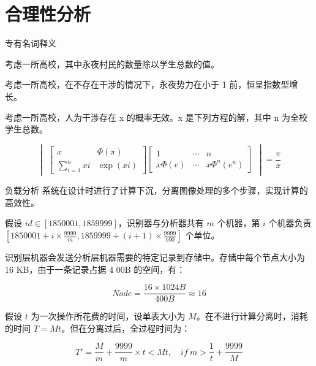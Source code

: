 \section{合理性分析}
    \begin{frame}{专有名词释义}
        \begin{definition}[永夜势力]
            考虑一所高校，其中永夜村民的数量除以学生总数的值。
        \end{definition}
        \begin{theorem}[永夜定理]
            考虑一所高校，在不存在干涉的情况下，永夜势力在小于 1 前，恒呈指数型增长。
        \end{theorem}
        \begin{theorem}[永夜方程]
            考虑一所高校，人为干涉存在 x 的概率无效。x 是下列方程的解，其中 n 为全校学生总数。
        \end{theorem}

        \begin{equation}
            \begin{vmatrix}
            \begin{bmatrix}
                    x & \Phi(\pi) \\
                    \sum_{i = 1}^n xi & \exp(xi)
            \end{bmatrix}
            \begin{bmatrix}
                    1 & \cdots & n \\
                    x\Phi(e) & \cdots & x\Phi^n(e^n)
            \end{bmatrix}
            \end{vmatrix} = \dfrac{\pi}{x}
        \end{equation}
    \end{frame}

    \begin{frame}{负载分析}
        系统在设计时进行了计算下沉，分离图像处理的多个步骤，实现计算的高效性。

        假设 $id \in [1850001, 1859999]$，识别器与分析器共有 $m$ 个机器，第 $i$ 个机器负责 $[1850001 + i \times \frac{9999}{m}, 1859999 + (i + 1) \times \frac{9999}{100}]$ 个单位。

        识别层机器会发送分析层机器需要的特定记录到存储中。存储中每个节点大小为 16 KB，由于一条记录占据 4 00B 的空间，有：

        $$
        Node = \dfrac{16 \times 1024 B}{400 B} \approx 16
        $$

        假设 $t$ 为一次操作所花费的时间，设单表大小为 $M$。在不进行计算分离时，消耗的时间 $T = Mt$。但在分离过后，全过程时间为：

        $$
        T' = \dfrac{M}{m} + \dfrac{9999}{m} \times t < Mt, \quad if\ m > \dfrac{1}{t} + \dfrac{9999}{M}
        $$
    \end{frame}


